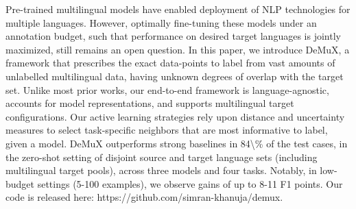 Pre-trained multilingual models have enabled deployment of NLP technologies for multiple languages. However, optimally fine-tuning these models under an annotation budget, such that performance on desired target languages is jointly maximized, still remains an open question. In this paper, we introduce DeMuX, a framework that prescribes the exact data-points to label from vast amounts of unlabelled multilingual data, having unknown degrees of overlap with the target set. Unlike most prior works, our end-to-end framework is language-agnostic, accounts for model representations, and supports multilingual target configurations. Our active learning strategies rely upon distance and uncertainty measures to select task-specific neighbors that are most informative to label, given a model. DeMuX outperforms strong baselines in 84\textbackslash{}\% of the test cases, in the zero-shot setting of disjoint source and target language sets (including multilingual target pools), across three models and four tasks. Notably, in low-budget settings (5-100 examples), we observe gains of up to 8-11 F1 points. Our code is released here: https://github.com/simran-khanuja/demux.